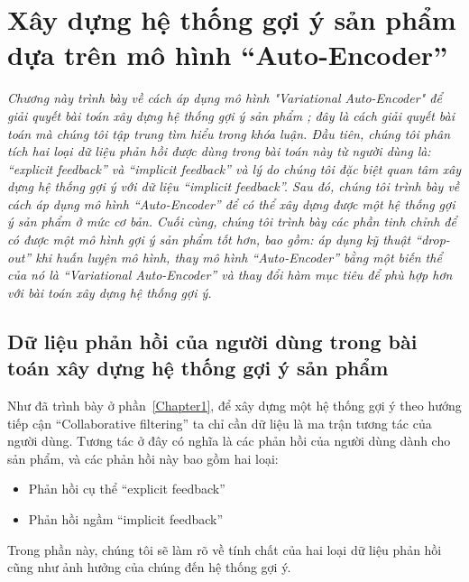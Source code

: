 \chapter{Xây dựng hệ thống gợi ý sản phẩm dựa trên mô hình ``Auto-Encoder''}
\graphicspath{{Chapter3/Chapter3Figs}}
\label{Chapter3}

\textit{Chương này trình bày về cách áp dụng mô hình "Variational Auto-Encoder" để giải quyết bài toán xây dựng hệ thống gợi ý sản phẩm \cite{mvae}; đây là cách giải quyết bài toán mà chúng tôi tập trung tìm hiểu trong khóa luận. 
Đầu tiên, chúng tôi phân tích hai loại dữ liệu phản hồi được dùng trong bài toán này từ người dùng là:
``explicit feedback'' và ``implicit feedback'' và lý do chúng tôi đặc biệt quan tâm xây dựng hệ thống gợi ý với dữ liệu ``implicit feedback''.
Sau đó, chúng tôi trình bày về cách áp dụng mô hình ``Auto-Encoder'' để có thể xây dựng được một hệ thống gợi ý sản phẩm ở mức cơ bản. 
Cuối cùng, chúng tôi trình bày các phần tinh chỉnh để có được một mô hình gợi ý sản phẩm tốt hơn, bao gồm: áp dụng kỹ thuật ``drop-out'' khi huấn luyện mô hình, thay mô hình ``Auto-Encoder'' bằng một biến thể của nó là ``Variational Auto-Encoder'' và thay đổi hàm mục tiêu để phù hợp hơn với bài toán xây dựng hệ thống gợi ý.}


\section{Dữ liệu phản hồi của người dùng trong bài toán xây dựng hệ thống gợi ý sản phẩm}
    Như đã trình bày ở phần~\ref{Chapter1}, để xây dựng một hệ thống gợi ý 
    theo hướng tiếp cận ``Collaborative filtering'' ta chỉ cần dữ liệu là ma trận tương tác của người dùng.
    Tương tác ở đây có nghĩa là các phản hồi của người dùng dành cho sản phẩm, và các phản hồi này bao gồm hai loại:
    \begin{itemize}
        \item Phản hồi cụ thể ``explicit feedback''
        \item Phản hồi ngầm ``implicit feedback''
    \end{itemize}
    Trong phần này, chúng tôi sẽ làm rõ về tính chất của hai loại dữ liệu phản hồi cũng như ảnh hưởng của chúng đến hệ thống gợi ý.

